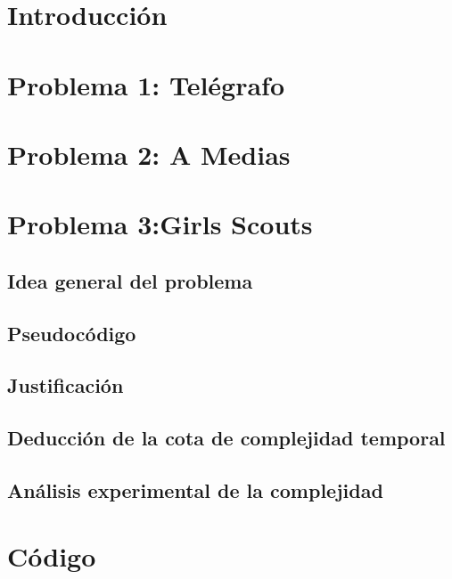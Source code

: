 \documentclass[10pt,a4paper]{article}
\begin{document}
\fecha{\today}



\maketitle

\newpage
\tableofcontents		%

\newpage
\section{Introducción}




\section{Problema 1: \textbf{Telégrafo}}


\newpage
\section{Problema 2: \textbf{A Medias}}


\newpage
\section{Problema 3:\textbf{Girls Scouts}}
\subsection{Idea general del problema}
\newpage
\subsection{Pseudocódigo}
\newpage
\subsection{Justificación}
\newpage
\subsection{Deducción de la cota de complejidad temporal}
\newpage
\subsection{Análisis experimental de la complejidad}
%

\newpage
\section{Código}
%

%
\end{document}
